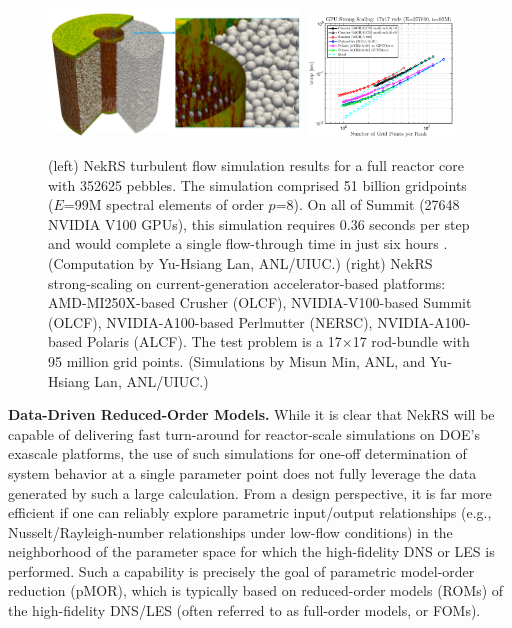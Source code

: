 \begin{figure}[t!] \centering
    \includegraphics[width = 0.60\textwidth]{figs/pbr_pair.png}
    \includegraphics[width = 0.35\textwidth]{figs/nekrs_17x17_crusher_strong.png}
    \caption{(left) NekRS turbulent flow simulation results for a full reactor
core with 352625 pebbles.  The simulation comprised 51 billion gridpoints
($E$=99M spectral elements of order $p$=8).  On all of Summit (27648 NVIDIA
V100 GPUs), this simulation requires 0.36 seconds per step and would complete a
single flow-through time in just six hours \cite{sc22}. (Computation by
Yu-Hsiang Lan, ANL/UIUC.)
(right) NekRS strong-scaling on current-generation accelerator-based platforms:
AMD-MI250X-based Crusher (OLCF),
NVIDIA-V100-based Summit (OLCF),
NVIDIA-A100-based Perlmutter (NERSC),
NVIDIA-A100-based Polaris (ALCF).
The test problem is a 17$\times$17 rod-bundle with 95 million grid points.
(Simulations by Misun Min, ANL, and Yu-Hsiang Lan, ANL/UIUC.)
\label{fig:pbr}}
\end{figure}


\noindent
{\bf Data-Driven Reduced-Order Models.}
While it is clear that NekRS will be capable of delivering fast turn-around
for reactor-scale simulations on DOE's exascale platforms, the use of 
such simulations for one-off determination of system behavior at a single
parameter point does not fully leverage the data generated by such a large
calculation.
From a design perspective, it is far more efficient if one can reliably
explore parametric input/output relationships (e.g., Nusselt/Rayleigh-number
relationships under low-flow conditions) in the neighborhood of the parameter
space for which the high-fidelity DNS or LES is performed.   Such a capability
is precisely the goal of parametric model-order reduction (pMOR), which is
typically based on reduced-order models (ROMs) of the high-fidelity DNS/LES
(often referred to as full-order models, or FOMs).   

